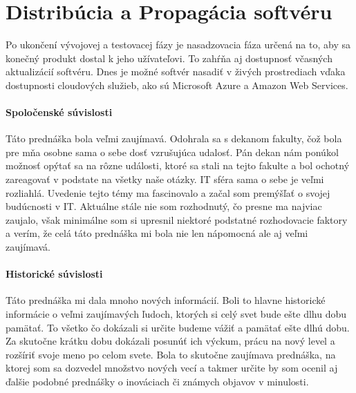 \documentclass[10pt,twoside,slovak,a4paper]{article}
\begin{document}
\section{Distribúcia a Propagácia softvéru}
Po ukončení vývojovej a testovacej fázy je nasadzovacia fáza určená na to, aby sa konečný produkt dostal k jeho užívateľovi. To zahŕňa aj dostupnosť včasných aktualizácií softvéru. Dnes je možné softvér nasadiť v živých prostrediach vďaka dostupnosti cloudových služieb, ako sú Microsoft Azure a Amazon Web Services.












\paragraph{Spoločenské súvislosti}
Táto prednáška bola veľmi zaujímavá. Odohrala sa s dekanom fakulty, čož bola pre mňa osobne sama o sebe dosť vzrušujúca udalosť. Pán dekan nám ponúkol možnosť opýtať sa na rôzne události, ktoré sa stali na tejto fakulte a bol ochotný zareagovať v podstate na všetky naše otázky. IT sféra sama o sebe je veľmi rozliahlá. Uvedenie tejto témy ma fascinovalo a začal som premýšľať o svojej budúcnosti v IT. Aktuálne stále nie som rozhodnutý, čo presne ma najviac zaujalo, však minimálne som si upresnil niektoré podstatné rozhodovacie faktory a verím, že celá táto prednáška mi bola nie len nápomocná ale aj veľmi zaujímavá.

\paragraph{Historické súvislosti}
Táto prednáška mi dala mnoho nových informácií. Boli to hlavne historické informácie o veľmi zaujímavých ľudoch, ktorých si celý svet bude ešte dlhu dobu pamätať. To všetko čo dokázali si určite budeme vážiť a pamätať ešte dlhú dobu. Za skutočne krátku dobu dokázali posunúť ich výckum, prácu na nový level a rozšíriť svoje meno po celom svete. Bola to skutočne zaujímava prednáška, na ktorej som sa dozvedel množstvo nových vecí a takmer určite by som ocenil aj ďalšie podobné prednášky o inováciach či známych objavov v minulosti.
\end{document}
